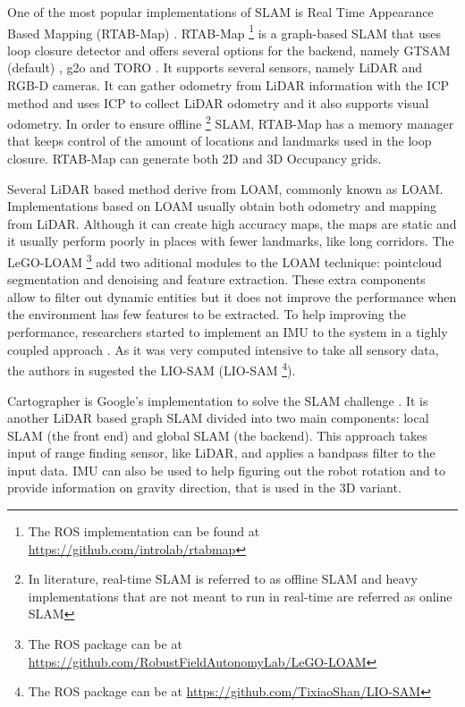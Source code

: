 One of the most popular implementations of \acs*{SLAM} is Real Time Appearance Based Mapping (RTAB-Map) \cite{labbe_rtab-map_2019}. RTAB-Map \footnote{The \acs*{ROS} implementation can be found at \url{https://github.com/introlab/rtabmap}} is a graph-based \acs*{SLAM} that uses loop closure detector and offers several options for the backend, namely GTSAM (default) \cite{gtsam}, g2o \cite{kummerle_g2o_2011} and TORO \cite{grisetti_nonlinear_2009}. It supports several sensors, namely \acs*{LiDAR} and RGB-D cameras. It can gather odometry from \acs*{LiDAR} information with the \acs*{ICP} method and uses \acs*{ICP} to collect \acs*{LiDAR} odometry and it also supports visual odometry. In order to ensure offline \footnote{In literature, real-time \acs*{SLAM} is referred to as offline \acs*{SLAM} and heavy implementations that are not meant to run in real-time are referred as online \acs*{SLAM}} \acs*{SLAM}, RTAB-Map has a memory manager that keeps control of the amount of locations and landmarks used in the loop closure. RTAB-Map can generate both 2D and 3D Occupancy grids.

Several \acs*{LiDAR} based method derive from \acl*{LOAM}, commonly known as \acs*{LOAM}. Implementations based on \acs*{LOAM} usually obtain both odometry and mapping from \acs*{LiDAR}. Although it can create high accuracy maps, the maps are static and it usually perform poorly in places with fewer landmarks, like long corridors. The LeGO-LOAM \footnote{The \acs*{ROS} package can be at \url{https://github.com/RobustFieldAutonomyLab/LeGO-LOAM}} add two aditional modules to the \acs*{LOAM} technique: pointcloud segmentation and denoising and feature extraction. These extra components allow to filter out dynamic entities but it does not improve the performance when the environment has few features to be extracted. To help improving the performance, researchers started to implement an \acs*{IMU} to the system in a tighly coupled approach \cite{ye2019tightly}. As it was very computed intensive to take all sensory data, the authors in \cite{liosam2020shan} sugested the \acl*{LIO-SAM} (\acs*{LIO-SAM} \footnote{The \acs*{ROS} package can be at \url{https://github.com/TixiaoShan/LIO-SAM}}).

Cartographer is Google's implementation to solve the \acs*{SLAM} challenge \cite{hess_real-time_2016}. It is another \acs*{LiDAR} based graph \acs*{SLAM} divided into two main components: local \acs*{SLAM} (the front end) and global \acs*{SLAM} (the backend). This approach takes input of range finding sensor, like \acs*{LiDAR}, and applies a bandpass filter to the input data. \acs*{IMU} can also be used to help figuring out the robot rotation and to provide information on gravity direction, that is used in the 3D variant. 


